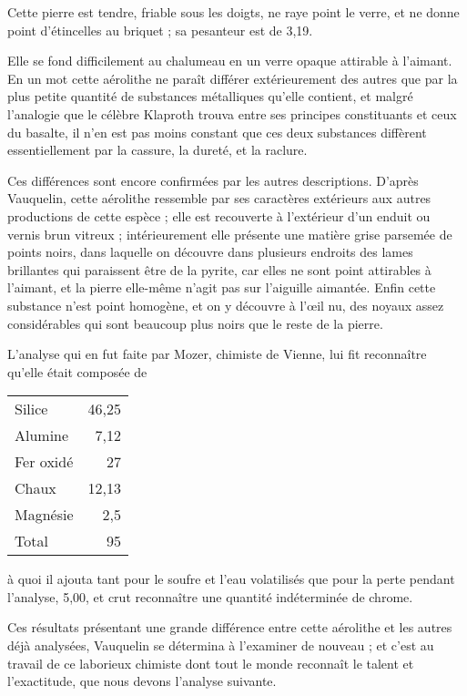 \documentclass[a4paper, 12pt, oneside, french]{article}
\begin{document}
Cette pierre est tendre, friable sous les doigts, ne raye point le verre, et ne donne point d'étincelles au briquet ; sa pesanteur est de 3,19.

Elle se fond difficilement au chalumeau en un verre opaque attirable à l'aimant. En un mot cette aérolithe ne paraît différer extérieurement des autres que par la plus petite quantité de substances métalliques qu'elle contient, et malgré l'analogie que le célèbre Klaproth trouva entre ses principes constituants et ceux du basalte, il n'en est pas moins constant que ces deux substances diffèrent essentiellement par la cassure, la dureté, et la raclure.

Ces différences sont encore confirmées par les autres descriptions. D'après Vauquelin, cette aérolithe ressemble par ses caractères extérieurs aux autres productions de cette espèce ; elle est recouverte à l'extérieur d'un enduit ou vernis brun vitreux ; intérieurement elle présente une matière grise parsemée de points noirs, dans laquelle on découvre dans plusieurs endroits des lames brillantes qui paraissent être de la pyrite, car elles ne sont point attirables à l'aimant, et la pierre elle-même n'agit pas sur l'aiguille aimantée. Enfin cette substance n'est point homogène, et on y découvre à l'œil nu, des noyaux assez considérables qui sont beaucoup plus noirs que le reste de la pierre.

L'analyse qui en fut faite par Mozer, chimiste de Vienne, lui fit reconnaître qu'elle était composée de
\begin{table}[H]
    \centering
    \Fontauri
    \large
    \begin{tabular}{l r}
        Silice & 46,25 \\
        Alumine & 7,12 \\
        Fer oxidé & 27 \\
        Chaux & 12,13 \\
        Magnésie & 2,5 \\ \hline
        Total & 95 \\
    \end{tabular}
\end{table}
à quoi il ajouta tant pour le soufre et l'eau volatilisés que pour la perte pendant l'analyse, 5,00, et crut reconnaître une quantité indéterminée de chrome.

Ces résultats présentant une grande différence entre cette aérolithe et les autres déjà analysées, Vauquelin se détermina à l'examiner de nouveau ; et c'est au travail de ce laborieux chimiste dont tout le monde reconnaît le talent et l'exactitude, que nous devons l'analyse suivante.
\end{document}
